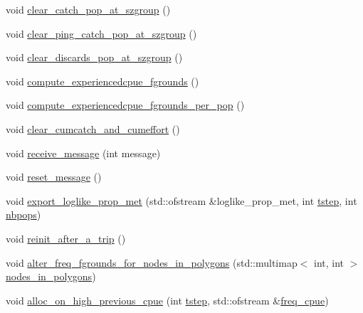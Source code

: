 \begin{DoxyCompactItemize}
void \mbox{\hyperlink{class_vessel_aa85be09ec6d60f86e98a5bc7a809ebea}{clear\+\_\+catch\+\_\+pop\+\_\+at\+\_\+szgroup}} ()
\item 
void \mbox{\hyperlink{class_vessel_af971fc3f67f7413abf5182e59085b27f}{clear\+\_\+ping\+\_\+catch\+\_\+pop\+\_\+at\+\_\+szgroup}} ()
\item 
void \mbox{\hyperlink{class_vessel_acd9152938fbabd61887207de86200034}{clear\+\_\+discards\+\_\+pop\+\_\+at\+\_\+szgroup}} ()
\item 
void \mbox{\hyperlink{class_vessel_aa3564ac86c4965a228be81ed2a2b92bf}{compute\+\_\+experiencedcpue\+\_\+fgrounds}} ()
\item 
void \mbox{\hyperlink{class_vessel_a4c299fe9205eb1e95c9fc966051e0acc}{compute\+\_\+experiencedcpue\+\_\+fgrounds\+\_\+per\+\_\+pop}} ()
\item 
void \mbox{\hyperlink{class_vessel_a34baf7567634193caf98e9e40da9afd4}{clear\+\_\+cumcatch\+\_\+and\+\_\+cumeffort}} ()
\item 
void \mbox{\hyperlink{class_vessel_a61d380e42e95e28e7cb4be8e10311c1d}{receive\+\_\+message}} (int message)
\item 
void \mbox{\hyperlink{class_vessel_a0a776522dd340a5e213e039ff2fba42a}{reset\+\_\+message}} ()
\item 
void \mbox{\hyperlink{class_vessel_a60a2f2364bc62b790027839d42adb790}{export\+\_\+loglike\+\_\+prop\+\_\+met}} (std\+::ofstream \&loglike\+\_\+prop\+\_\+met, int \mbox{\hyperlink{thread__vessels_8cpp_a84bc73d278de929ec9974e1a95d9b23a}{tstep}}, int \mbox{\hyperlink{thread__vessels_8cpp_a664e1cfcbba8af93cd65eaeb74e3b3a5}{nbpops}})
\item 
void \mbox{\hyperlink{class_vessel_ac1471f588ce59811af60a76e0d6911f2}{reinit\+\_\+after\+\_\+a\+\_\+trip}} ()
\item 
void \mbox{\hyperlink{class_vessel_a76f874c94638b6e4f9d88320172f4b04}{alter\+\_\+freq\+\_\+fgrounds\+\_\+for\+\_\+nodes\+\_\+in\+\_\+polygons}} (std\+::multimap$<$ int, int $>$ \mbox{\hyperlink{thread__vessels_8cpp_ae1aa0d83e8fc56ca827ccf47a01cd126}{nodes\+\_\+in\+\_\+polygons}})
\item 
void \mbox{\hyperlink{class_vessel_aa1b36bd9af5a719e2be270ce60d29ef2}{alloc\+\_\+on\+\_\+high\+\_\+previous\+\_\+cpue}} (int \mbox{\hyperlink{thread__vessels_8cpp_a84bc73d278de929ec9974e1a95d9b23a}{tstep}}, std\+::ofstream \&\mbox{\hyperlink{thread__vessels_8cpp_ad541b5d62baa9ad6aec2c8cbefaa3b9a}{freq\+\_\+cpue}})
\item 

\end{DoxyCompactItemize}
